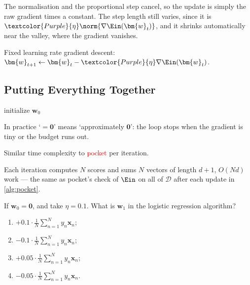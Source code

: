 The normalisation and the proportional step cancel, so the update is simply
the raw gradient times a constant. The step length still varies, since it is
\(\textcolor{Purple}{\eta} \norm{\nabla \Ein(\bm{w}_t)}\), and it shrinks
automatically near the valley, where the gradient vanishes.

\begin{moral}
    Fixed learning rate gradient descent: \(\bm{w}_{t+1} \gets \bm{w}_t -
    \textcolor{Purple}{\eta} \nabla \Ein(\bm{w}_t)\).
\end{moral}

\subsection{Putting Everything Together}

\begin{algorithm}[H]
    \caption{Logistic Regression}\label{alg:logreg}
    initialize \(\bm{w}_0\)\;
\end{algorithm}

In practice `\(= \bm{0}\)' means `approximately \(\bm{0}\)': the loop stops when
the gradient is tiny or the budget runs out.

\begin{moral}
    Similar time complexity to \textcolor{red}{pocket} per iteration.
\end{moral}

Each iteration computes \(N\) scores and sums \(N\) vectors of length \(d + 1\),
\(O(Nd)\) work --- the same as pocket's check of \(\Ein\) on all of
\(\mathcal{D}\) after each update in \autoref{alg:pocket}.

\begin{exercise}
    If \(\bm{w}_0 = \bm{0}\), and take \(\eta = 0.1\). What is \(\bm{w}_1\) in
    the logistic regression algorithm?
    \begin{enumerate}[(1)]
        \item \(+0.1 \cdot \frac{1}{N} \sum_{n=1}^N y_n \bm{x}_n\);
        \item \(-0.1 \cdot \frac{1}{N} \sum_{n=1}^N y_n \bm{x}_n\);
        \item \(+0.05 \cdot \frac{1}{N} \sum_{n=1}^N y_n \bm{x}_n\);
        \item \(-0.05 \cdot \frac{1}{N} \sum_{n=1}^N y_n \bm{x}_n\).
    \end{enumerate}
\end{exercise}


